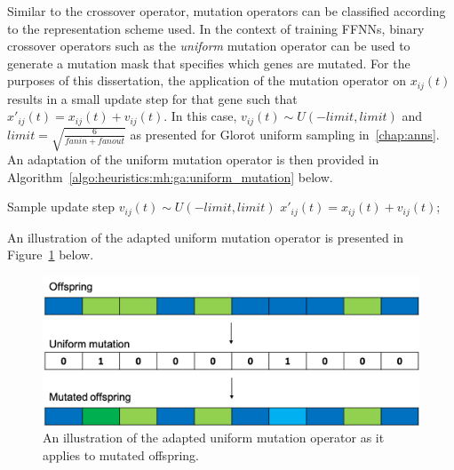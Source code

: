 Similar to the crossover operator, mutation operators can be classified according to the representation scheme used. In the context of training
\acp{FFNN}, binary crossover operators such as the \textit{uniform} mutation operator can be used to generate a mutation mask that specifies which genes are mutated. For the purposes of this dissertation, the application of the mutation operator on $x_{ij}(t)$ results in a small update step for that gene such that $x'_{ij}(t) = x_{ij}(t) + v_{ij}(t)$. In this case, $v_{ij}(t) \sim U(-limit, limit)$ and $limit = \sqrt{\frac{6}{fanin + fanout}}$ as presented for Glorot uniform sampling in~\ref{chap:anns}. An adaptation of the uniform mutation operator is then provided in Algorithm~\ref{algo:heuristics:mh:ga:uniform_mutation} below.

\begin{algorithm}[H]
      \caption{The pseudo code for the uniform mutation operator as used by \acp{GA}.}
      \label{algo:heuristics:mh:ga:uniform_mutation}
      \begin{algorithmic}
            \State Sample update step $v_{ij}(t) \sim U(-limit, limit)$
            \State $x'_{ij}(t) = x_{ij}(t) + v_{ij}(t)$;
            \EndIf
            \EndFor
            \State
      \end{algorithmic}
\end{algorithm}

An illustration of the adapted uniform mutation operator is presented in Figure~\ref{fig:heuristics:mh:ga:uniform_mutation} below.

\begin{figure}[htbp]
      \includegraphics[width=\textwidth]{images/uniform_mutation.png}
      \caption{An illustration of the adapted uniform mutation operator as it applies to mutated offspring.}
      \label{fig:heuristics:mh:ga:uniform_mutation}
\end{figure}


